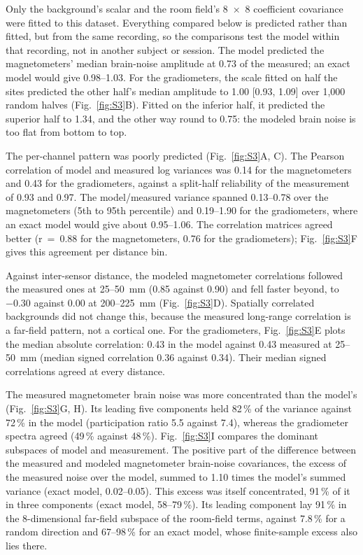 \documentclass[preprint,12pt,authoryear,a4paper]{elsarticle}
\begin{document}
Only the background's scalar and the room field's 8~×~8 coefficient covariance were fitted to this dataset. Everything compared below is predicted rather than fitted, but from the same recording, so the comparisons test the model within that recording, not in another subject or session. The model predicted the magnetometers' median brain-noise amplitude at 0.73 of the measured; an exact model would give 0.98–1.03. For the gradiometers, the scale fitted on half the sites predicted the other half's median amplitude to 1.00 [0.93, 1.09] over 1,000 random halves (Fig.~\ref{fig:S3}B). Fitted on the inferior half, it predicted the superior half to 1.34, and the other way round to 0.75: the modeled brain noise is too flat from bottom to top.

The per-channel pattern was poorly predicted (Fig.~\ref{fig:S3}A, C). The Pearson correlation of model and measured log variances was 0.14 for the magnetometers and 0.43 for the gradiometers, against a split-half reliability of the measurement of 0.93 and 0.97. The model/measured variance spanned 0.13–0.78 over the magnetometers (5th to 95th percentile) and 0.19–1.90 for the gradiometers, where an exact model would give about 0.95–1.06. The correlation matrices agreed better (r~=~0.88 for the magnetometers, 0.76 for the gradiometers); Fig.~\ref{fig:S3}F gives this agreement per distance bin.

Against inter-sensor distance, the modeled magnetometer correlations followed the measured ones at 25–50~mm (0.85 against 0.90) and fell faster beyond, to −0.30 against 0.00 at 200–225~mm (Fig.~\ref{fig:S3}D). Spatially correlated backgrounds did not change this, because the measured long-range correlation is a far-field pattern, not a cortical one. For the gradiometers, Fig.~\ref{fig:S3}E plots the median absolute correlation: 0.43 in the model against 0.43 measured at 25–50~mm (median signed correlation 0.36 against 0.34). Their median signed correlations agreed at every distance.

The measured magnetometer brain noise was more concentrated than the model's (Fig.~\ref{fig:S3}G, H). Its leading five components held 82\,\% of the variance against 72\,\% in the model (participation ratio 5.5 against 7.4), whereas the gradiometer spectra agreed (49\,\% against 48\,\%). Fig.~\ref{fig:S3}I compares the dominant subspaces of model and measurement. The positive part of the difference between the measured and modeled magnetometer brain-noise covariances, the excess of the measured noise over the model, summed to 1.10 times the model's summed variance (exact model, 0.02–0.05). This excess was itself concentrated, 91\,\% of it in three components (exact model, 58–79\,\%). Its leading component lay 91\,\% in the 8-dimensional far-field subspace of the room-field terms, against 7.8\,\% for a random direction and 67–98\,\% for an exact model, whose finite-sample excess also lies there.
\end{document}
